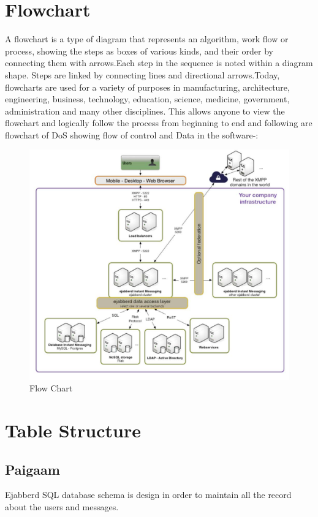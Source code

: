 \section{Flowchart}
A flowchart is a type of diagram that represents an algorithm, work flow or process, showing the steps as boxes of various kinds, and their order by connecting them with arrows.Each step in the sequence is noted within a diagram shape. Steps are linked by connecting lines and directional arrows.Today, flowcharts are used for a variety of purposes in manufacturing, architecture, engineering, business, technology, education, science, medicine, government, administration and many other disciplines. This allows anyone to view the flowchart and logically follow the process from beginning to end and following are flowchart of DoS showing flow of control and Data in the software-:
\begin{figure}[ht]
\centering
\includegraphics[scale=0.32]{input/images/fl.png}
\caption{Flow Chart}
\end{figure}
\hspace{-1.7em}
\newpage


\section{Table Structure}
\subsection{Paigaam}
Ejabberd SQL database schema is design in order to maintain all the record about the users and messages.\\

